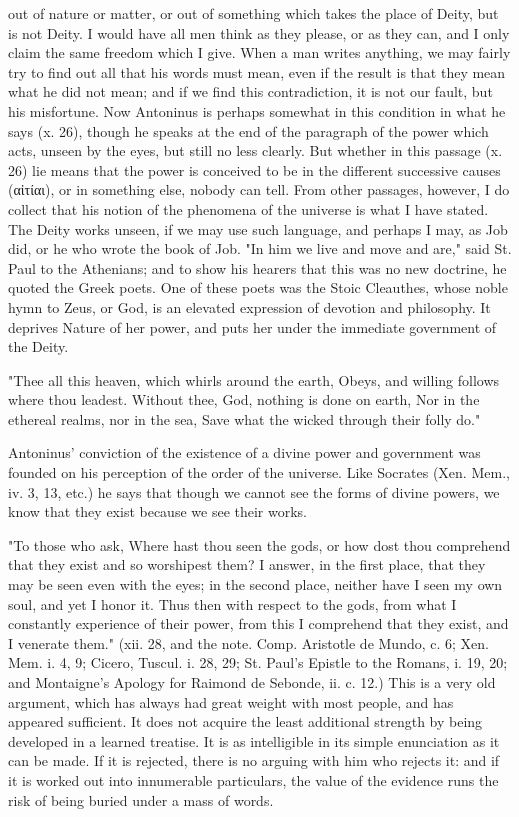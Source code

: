 out of nature or matter, or out of something which takes the place of Deity, but is not Deity. I would have all men think as they please, or as they can, and I only claim the same freedom which I give. When a man writes anything, we may fairly try to find out all that his words must mean, even if the result is that they mean what he did not mean; and if we find this contradiction, it is not our fault, but his misfortune. Now Antoninus is perhaps somewhat in this condition in what he says (x. 26), though he speaks at the end of the paragraph of the power which acts, unseen by the eyes, but still no less clearly. But whether in this passage (x. 26) lie means that the power is conceived to be in the different successive causes (\textgreek{αἰτίαι}), or in something else, nobody can tell. From other passages, however, I do collect that his notion of the phenomena of the universe is what I have stated. The Deity works unseen, if we may use such language, and perhaps I may, as Job did, or he who wrote the book of Job. "In him we live and move and are," said St. Paul to the Athenians; and to show his hearers that this was no new doctrine, he quoted the Greek poets. One of these poets was the Stoic Cleauthes, whose noble hymn to Zeus, or God, is an elevated expression of devotion and philosophy. It deprives Nature of her power, and puts her under the immediate government of the Deity.

"Thee all this heaven, which whirls around the earth,
Obeys, and willing follows where thou leadest.
Without thee, God, nothing is done on earth,
Nor in the ethereal realms, nor in the sea,
Save what the wicked through their folly do."

Antoninus' conviction of the existence of a divine power and government was founded on his perception of the order of the universe. Like Socrates (Xen. Mem., iv. 3, 13, etc.) he says that though we cannot see the forms of divine powers, we know that they exist because we see their works.

"To those who ask, Where hast thou seen the gods, or how dost thou comprehend that they exist and so worshipest them? I answer, in the first place, that they may be seen even with the eyes; in the second place, neither have I seen my own soul, and yet I honor it. Thus then with respect to the gods, from what I constantly experience of their power, from this I comprehend that they exist, and I venerate them." (xii. 28, and the note. Comp. Aristotle de Mundo, c. 6; Xen. Mem. i. 4, 9; Cicero, Tuscul. i. 28, 29; St. Paul's Epistle to the Romans, i. 19, 20; and Montaigne's Apology for Raimond de Sebonde, ii. c. 12.) This is a very old argument, which has always had great weight with most people, and has appeared sufficient. It does not acquire the least additional strength by being developed in a learned treatise. It is as intelligible in its simple enunciation as it can be made. If it is rejected, there is no arguing with him who rejects it: and if it is worked out into innumerable particulars, the value of the evidence runs the risk of being buried under a mass of words.

